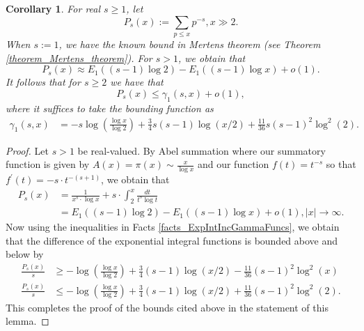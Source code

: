 \documentclass[11pt,reqno,a4letter]{article}
\numberwithin{figure}{section}
\numberwithin{table}{section}
\theoremstyle{plain}
\newtheorem{cor}[theorem]{Corollary}
\numberwithin{theorem}{section}
\theoremstyle{definition}
\newcommand{\NBRef}[1]{
     \todo[linecolor=green!85!white,backgroundcolor=orange!50!white,bordercolor=blue!30!black,textcolor=cyan!15!black,shadow,size=\small,fancyline]{
     \color{NBRefColor}{\textbf{#1}
     }
     }
}
\begin{document}
\begin{cor} 
\label{cor_PartialSumsOfReciprocalsOfPrimePowers} 
For real $s \geq 1$, let 
\[
P_s(x) := \sum_{p \leq x} p^{-s}, x \gg 2. 
\]
When $s := 1$, we have the known bound in Mertens theorem 
(see Theorem \ref{theorem_Mertens_theorem}). For $s > 1$, we obtain that 
\[
P_s(x) \approx E_1((s-1) \log 2) - E_1((s-1) \log x) + o(1). 
\]
It follows that for $s \geq 2$ we have that 
\[
P_s(x) \leq \gamma_1(s, x) + o(1), 
\]
where it suffices to take the bounding function as 
\begin{align*}
\gamma_1(s, x) & = -s\log\left(\frac{\log x}{\log 2}\right) + \frac{3}{4}s(s-1) \log(x/2) + 
     \frac{11}{36} s(s-1)^2 \log^2(2). 
\end{align*}
\end{cor} 
\NBRef{A05-2020-04-26} 
\begin{proof} 
Let $s > 1$ be real-valued. 
By Abel summation where our summatory function is given by $A(x) = \pi(x) \sim \frac{x}{\log x}$ and 
our function $f(t) = t^{-s}$ so that $f^{\prime}(t) = -s \cdot t^{-(s+1)}$, we obtain that 
\begin{align*} 
P_s(x) & = \frac{1}{x^s \cdot \log x} + s \cdot \int_2^{x} \frac{dt}{t^s \log t} \\ 
     & = E_1((s-1) \log 2) - E_1((s-1) \log x) + o(1), |x| \rightarrow \infty. 
\end{align*} 
Now using the inequalities in Facts \ref{facts_ExpIntIncGammaFuncs}, we obtain that the 
difference of the exponential integral functions is bounded above and below by 
\begin{align*} 
\frac{P_s(x)}{s} & \geq -\log\left(\frac{\log x}{\log 2}\right) + \frac{3}{4}(s-1) \log(x/2) - 
     \frac{11}{36} (s-1)^2 \log^2(x) \\ 
\frac{P_s(x)}{s} & \leq -\log\left(\frac{\log x}{\log 2}\right) + \frac{3}{4}(s-1) \log(x/2) + 
     \frac{11}{36} (s-1)^2 \log^2(2). 
\end{align*} 
This completes the proof of the bounds cited above in the statement of this lemma. 
\end{proof} 
\end{document}
